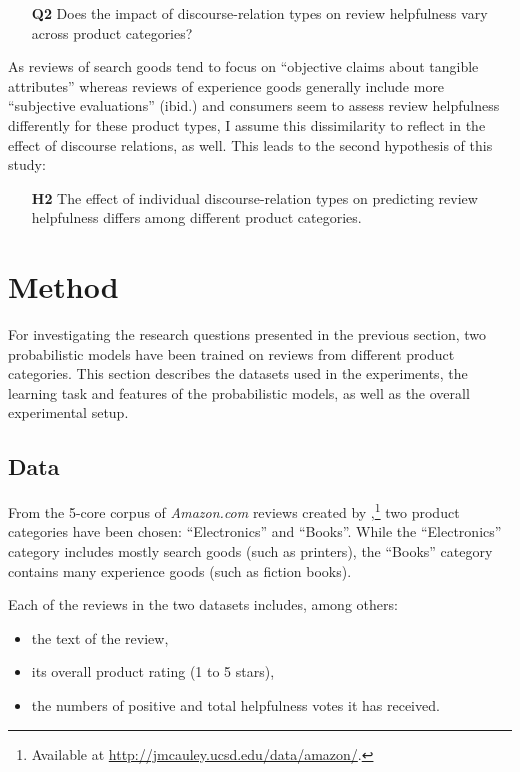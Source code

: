 \documentclass[
    a4paper,%
    12pt,%
    oneside,%
    toc=bibliography,
    final,
]{scrartcl}
\begin{document}
\begin{enumerate}[rightmargin=1cm]
\item[\textbf{Q2}] Does the impact of discourse-relation types on review helpfulness vary across product categories?
\end{enumerate}

As reviews of search goods tend to focus on “objective claims about tangible attributes” \citep[189]{MudambiSchuff2010} whereas reviews of experience goods generally include more “subjective evaluations” (ibid.) and consumers seem to assess review helpfulness differently for these product types, I assume this dissimilarity to reflect in the effect of discourse relations, as well. This leads to the second hypothesis of this study:

\begin{enumerate}[rightmargin=1cm]
\item[\textbf{H2}] The effect of individual discourse-relation types on predicting review helpfulness differs among different product categories.
\end{enumerate}

\section{Method}
\label{sec:method}

For investigating the research questions presented in the previous section, two probabilistic models have been trained on reviews from different product categories. This section describes the datasets used in the experiments, the learning task and features of the probabilistic models, as well as the overall experimental setup.

\subsection{Data}

From the 5-core corpus of \textit{Amazon.com} reviews created by \citet{HeMcAuley2016},\footnote{Available at \url{http://jmcauley.ucsd.edu/data/amazon/}.} two product categories have been chosen: “Electronics” and “Books”. While the “Electronics” category includes mostly search goods (such as printers), the “Books” category contains many experience goods (such as fiction books).

Each of the reviews in the two datasets includes, among others:

\begin{itemize}
\item the text of the review,
\item its overall product rating (1 to 5 stars),
\item the numbers of positive and total helpfulness votes it has received.
\end{itemize}
\end{document}
